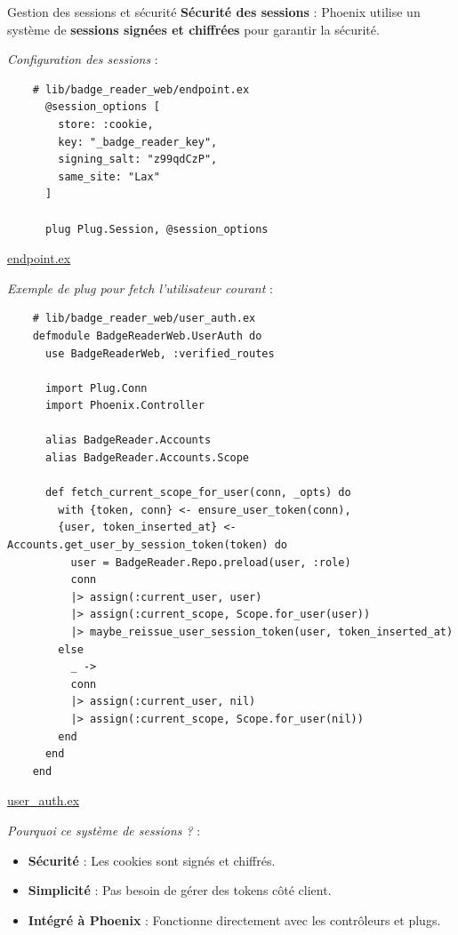 \begin{for_you}{Gestion des sessions et sécurité}
    \textbf{Sécurité des sessions} :
    Phoenix utilise un système de \textbf{sessions signées et chiffrées} pour garantir la sécurité.
    \newline

    \textit{Configuration des sessions} :
    \begin{lstlisting}
    # lib/badge_reader_web/endpoint.ex
      @session_options [
        store: :cookie,
        key: "_badge_reader_key",
        signing_salt: "z99qdCzP",
        same_site: "Lax"
      ]

      plug Plug.Session, @session_options
    \end{lstlisting}
    
    \href{https://github.com/Theoden-bernard/badge_reader_project/blob/develop/badge_reader/lib/badge_reader_web/endpoint.ex}{endpoint.ex \newline}

    \textit{Exemple de plug pour fetch l’utilisateur courant} :
    \begin{lstlisting}
    # lib/badge_reader_web/user_auth.ex
    defmodule BadgeReaderWeb.UserAuth do
      use BadgeReaderWeb, :verified_routes

      import Plug.Conn
      import Phoenix.Controller

      alias BadgeReader.Accounts
      alias BadgeReader.Accounts.Scope

      def fetch_current_scope_for_user(conn, _opts) do
        with {token, conn} <- ensure_user_token(conn),
        {user, token_inserted_at} <- Accounts.get_user_by_session_token(token) do
          user = BadgeReader.Repo.preload(user, :role)
          conn
          |> assign(:current_user, user)
          |> assign(:current_scope, Scope.for_user(user))
          |> maybe_reissue_user_session_token(user, token_inserted_at)
        else
          _ ->
          conn
          |> assign(:current_user, nil)
          |> assign(:current_scope, Scope.for_user(nil))
        end
      end
    end
    \end{lstlisting}

    \href{https://github.com/Theoden-bernard/badge_reader_project/blob/develop/badge_reader/lib/badge_reader_web/user_auth.ex}{user\_auth.ex \newline}

    \textit{Pourquoi ce système de sessions ?} :
    \begin{itemize}
        \item \textbf{Sécurité} : Les cookies sont signés et chiffrés.
        \item \textbf{Simplicité} : Pas besoin de gérer des tokens côté client.
        \item \textbf{Intégré à Phoenix} : Fonctionne directement avec les contrôleurs et plugs.
    \end{itemize}
\end{for_you}

